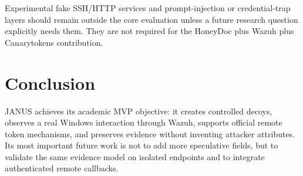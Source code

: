 Experimental fake SSH/HTTP services and prompt-injection or credential-trap
layers should remain outside the core evaluation unless a future research
question explicitly needs them. They are not required for the HoneyDoc plus
Wazuh plus Canarytokens contribution.

\section{Conclusion}

JANUS achieves its academic MVP objective: it creates controlled decoys,
observes a real Windows interaction through Wazuh, supports official remote
token mechanisms, and preserves evidence without inventing attacker
attributes. Its most important future work is not to add more speculative
fields, but to validate the same evidence model on isolated endpoints and to
integrate authenticated remote callbacks.
